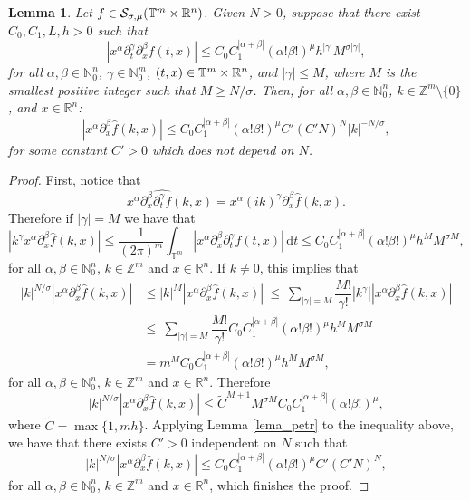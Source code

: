 \documentclass[11pt,reqno]{amsart}
\numberwithin{equation}{section}
\newtheorem{lemma}[theorem]{Lemma}
\theoremstyle{definition}
\theoremstyle{definition}
\newcommand{\T}{\mathbb{T}}
\newcommand{\G}{\mathnormal{\mathbb{T}^{m}\times\mathbb{R}^n}}
\newcommand{\R}{\mathbb{R}}
\newcommand{\Z}{\mathbb{Z}}
\newcommand{\N}{\mathbb{N}}
\renewcommand{\S}{\mathcal{S}_{\sigma,\mu}(\G)}
\begin{document}
    \begin{lemma}\label{lema332petr}
        Let $f\in\S$. Given $N>0$,  suppose that there exist $C_0,C_1,L,h>0$ such that
        \[|x^\alpha\partial_t^{\gamma}\partial_x^\beta f(t,x)|\leq C_0C_1^{|\alpha+\beta|}(\alpha!\beta!)^{\mu} h^{|\gamma|}M^{\sigma|\gamma|},\]
        for all $\alpha,\beta\in\N_0^n$, $\gamma\in\N_0^m$, $(t,x)\in\G$, and $|\gamma|\leq M$, where $M$ is the smallest positive integer such that $M\geq N/\sigma$. Then, for all $\alpha,\beta\in\N_0^n$, $k\in\Z^m\setminus\{0\}$, and $x\in\R^n$:
        \[|x^\alpha\partial_x^\beta\widehat{f}(k,x)|\leq C_0C_1^{|\alpha+\beta|}(\alpha!\beta!)^\mu C'(C'N)^{N}|k|^{-N/\sigma},\]
        for some constant $C'>0$ which does not depend on $N$.
    \end{lemma}
    \begin{proof}
        First, notice that
        \[x^\alpha\partial_x^\beta \widehat{\partial_t^\gamma f}(k,x) = x^\alpha (ik)^\gamma 
 \partial_x^\beta\widehat{f}(k,x).\]
        Therefore if $|\gamma|=M$ we have that
        \[|k^\gamma x^\alpha\partial_x^{\beta}\widehat{f}(k,x)|\leq \frac{1}{(2\pi)^{m}}\int_{\T^m}|x^\alpha\partial_x^\beta\partial_t^\gamma f(t,x)|\,\mathrm{d}t \leq C_0C_1^{|\alpha+\beta|}(\alpha!\beta!)^\mu h^{M}M^{\sigma M},\]
        for all $\alpha,\beta\in\N_0^n$, $k\in\Z^m$ and $x\in\R^n$. If $k\neq 0$, this implies that
        \begin{align*}
        |k|^{N/\sigma}|x^\alpha\partial_x^\beta \widehat{f}(k,x)| & \leq |k|^{M}|x^\alpha\partial_x^\beta \widehat{f}(k,x)|\ \leq\  \sum_{|\gamma|=M}\dfrac{M!}{\gamma!}|k^\gamma||x^\alpha\partial_x^\beta\widehat{f}(k,x)|\\
        & \leq\ \sum_{|\gamma|=M}\dfrac{M!}{\gamma!}C_0C_1^{|\alpha+\beta|}(\alpha!\beta!)^\mu h^M M^{\sigma M}\\
        & = m^M C_0C_1^{|\alpha+\beta|}(\alpha!\beta!)^\mu h^M M^{\sigma M},
        \end{align*}
        for all $\alpha,\beta\in\N_0^n$, $k\in\Z^m$ and $x\in\R^n$. Therefore
        \[|k|^{N/\sigma}|x^\alpha\partial_x^\beta\widehat{f}(k,x)|\leq \tilde{C}^{M+1}M^{\sigma M}C_0C_1^{|\alpha+\beta|}(\alpha!\beta!)^\mu,\]
        where $\tilde{C}=\max\{1,mh\}$. Applying Lemma \ref{lema_petr} to the inequality above, we have that there exists $C'>0$ independent on $N$ such that
        \[|k|^{N/\sigma}|x^\alpha\partial_x^\beta\widehat{f}(k,x)|\leq C_0C_1^{|\alpha+\beta|}(\alpha!\beta!)^\mu C'(C'N)^N,\]
        for all $\alpha,\beta\in\N_0^n$, $k\in\Z^m$ and $x\in\R^n$, which finishes the proof.
    \end{proof}
\end{document}
